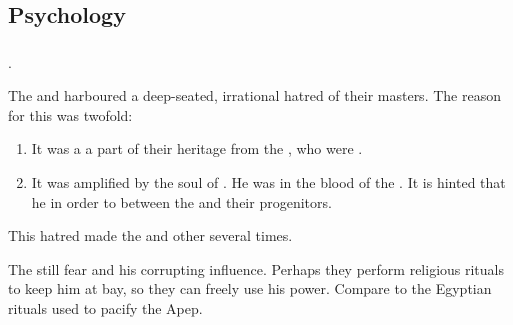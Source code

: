 \subsection{Psychology}





\subsubsection{\NexagglachelsCurse}

\Nexagglachel {}. 

The \satharioth{} and \ketherain{} harboured a deep-seated, irrational hatred of their \bane{} masters. 
The reason for this was twofold:

\begin{enumerate}
  \item 
    It was a a part of their heritage from the \banes, who were . 
  \item
    It was amplified by the soul of \Nexagglachel. 
    He was  in the blood of the \satharioth. 
    It is hinted that he  in order to  between the \resphain{} and their \bane{} progenitors.
\end{enumerate}

This hatred made the \satharioth{}  and other \resphain{} several times. 

The \resphain{} still fear \Nexagglachel{} and his corrupting influence. 
Perhaps they perform religious rituals to keep him at bay, so they can freely use his power. 
Compare to the Egyptian rituals used to pacify the \dragon{} Apep.





